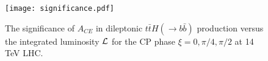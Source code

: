 \documentclass[twocolumn,prd,noshowpacs,nofootinbib,amsmath,amssymb,superscriptaddress,preprintnumbers]{revtex4}
\begin{document}



\begin{figure}[ht!]
\centering
\texttt{[image: significance.pdf]}
\caption{The significance of $A_{CE}$ in dileptonic $t\bar{t}H(\to b\bar{b})$ production versus the integrated luminosity ${\cal L}$ for the CP phase $\xi=0,\pi/4,\pi/2$ at 14 TeV LHC.}
\label{fig:significance}
\end{figure}
\end{document}
